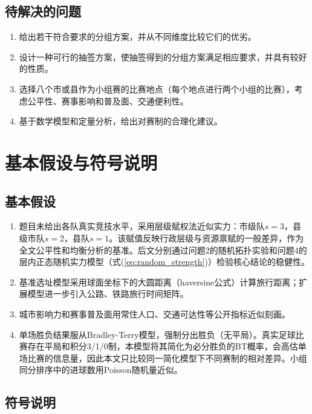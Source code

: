 \documentclass[12pt,a4paper]{article}
\begin{document}
\subsection{待解决的问题}

{\renewcommand{\labelenumi}{\textbf{问题\arabic{enumi}}}
  \begin{enumerate}
    \item 给出若干符合要求的分组方案，并从不同维度比较它们的优劣。
    \item 设计一种可行的抽签方案，使抽签得到的分组方案满足相应要求，并具有较好的性质。
    \item 选择八个市或县作为小组赛的比赛地点（每个地点进行两个小组的比赛），考虑公平性、赛事影响和普及面、交通便利性。
    \item 基于数学模型和定量分析，给出对赛制的合理化建议。
\end{enumerate}}

\section{基本假设与符号说明}

\subsection{基本假设}

{\renewcommand{\labelenumi}{\textbf{(\arabic{enumi})}}
  \begin{enumerate}
    \item 题目未给出各队真实竞技水平，采用层级赋权法近似实力：市级队$s=3$，县级市队$s=2$，县队$s=1$。该赋值反映行政层级与资源禀赋的一般差异，作为全文公平性和均衡分析的基准。后文分别通过问题2的随机拓扑实验和问题4的层内正态随机实力模型（式(\ref{eq:random_strength})）检验核心结论的稳健性。
    \item 基准选址模型采用球面坐标下的大圆距离（haversine公式）计算旅行距离；扩展模型进一步引入公路、铁路旅行时间矩阵。
    \item 城市影响力和赛事普及面用常住人口、交通可达性等公开指标近似刻画。
    \item 单场胜负结果服从Bradley-Terry模型，强制分出胜负（无平局）。真实足球比赛存在平局和积分3/1/0制，本模型将其简化为必分胜负的BT概率，会高估单场比赛的信息量，因此本文只比较同一简化模型下不同赛制的相对差异。小组同分排序中的进球数用Poisson随机量近似。
\end{enumerate}}

\subsection{符号说明}
\end{document}
